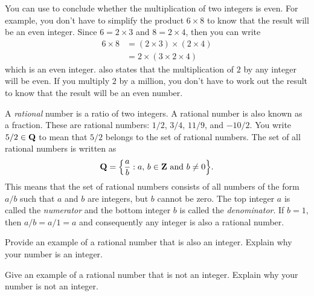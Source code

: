 \documentclass[a4paper,oneside,12pt]{article}
\begin{document}
You can use  to conclude
whether the multiplication of two integers is even.  For example, you
don't have to simplify the product $6 \times 8$ to know that the
result will be an even integer.  Since $6 = 2 \times 3$ and
$8 = 2 \times 4$, then you can write
\begin{align*}
6 \times 8
&= (2 \times 3) \times (2 \times 4) \\[4pt]
&=
2 \times (3 \times 2 \times 4)
\end{align*}
which is an even integer.  
also states that the multiplication of $2$ by any integer will be
even.  If you multiply $2$ by a million, you don't have to work out
the result to know that the result will be an even number.

A \emph{rational} number is a ratio of two integers.  A
rational number is also known as a fraction.  These are rational
numbers: $1/2$, $3/4$, $11/9$, and $-10/2$.  You write $5/2 \in \mathbf{Q}$
to mean that $5/2$ belongs to the set of rational numbers.  The set of
all rational numbers is written as
\[
\QQ
=
\setdes{
  \frac{a}{b}
}{
  \pair{a}{b} \in \ZZ
  \text{ and }
  b \neq 0
}.
\]
This means that the set of rational numbers consists of all numbers of
the form $a/b$ such that $a$ and $b$ are integers, but $b$ cannot be
zero.  The top integer $a$ is called the \emph{numerator} and the
bottom integer $b$ is called the \emph{denominator}.  If $b = 1$, then
$a/b = a/1 = a$ and consequently any integer is also a rational
number.

\begin{exercise}
Provide an example of a rational number that is also an integer.
Explain why your number is an integer.
\end{exercise}


\begin{exercise}
Give an example of a rational number that is not an integer.  Explain
why your number is not an integer.
\end{exercise}

\end{document}
